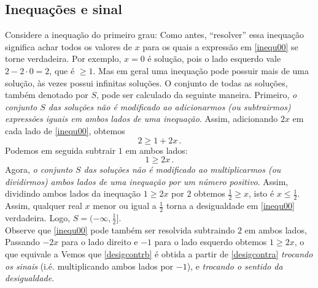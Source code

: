 \subsection{Inequações e sinal}
Considere a inequação do primeiro grau:
Como antes, ``resolver'' essa inequação significa achar todos os valores de 
$x$ para os quais a expressão em \eqref{inequ00} se torne verdadeira.
Por exemplo, $x=0$ é solução, pois o lado esquerdo vale $2-2\cdot 0=2$, que é $\geq 1$.
Mas em geral uma inequação pode possuir mais de uma solução, às vezes possui 
infinitas soluções.
O conjunto de todas as soluções, também denotado por $S$, pode ser calculado 
da seguinte maneira. Primeiro, \emph{o conjunto $S$ das soluções não é
modificado ao adicionarmos (ou subtrairmos)
 expressões iguais em ambos lados de uma inequação}. Assim, adicionando $2x$ em cada lado
de \eqref{inequ00}, obtemos
$$2\geq 1+2x\,.$$
Podemos em seguida subtrair $1$ em ambos lados:
$$1\geq 2x\,.$$
Agora, \emph{o conjunto $S$ das soluções não é modificado ao multiplicarmos 
(ou dividirmos) ambos lados de uma inequação por um número {positivo}}.
Assim, dividindo ambos lados da inequação $1\geq 2x$ por $2$ obtemos 
$\tfrac12\geq x$, isto é $x\leq \tfrac12$. Assim,
qualquer real $x$ menor ou igual a $\tfrac12$ torna a desigualdade em 
\eqref{inequ00} verdadeira. Logo, $S=(-\infty,\tfrac12]$.\\

Observe que 
\eqref{inequ00} pode também ser resolvida subtraindo $2$ em ambos lados,
 Passando $-2x$ para o lado direito e $-1$ para o lado esquerdo obtemos $1\geq 2x$, o que
equivale a 
 Vemos que \eqref{desigcontrb} é obtida a partir de \eqref{desigcontra} \emph{trocando os
sinais} (i.é. multiplicando ambos lados por $-1$), e \emph{trocando o sentido da
desigualdade}.

